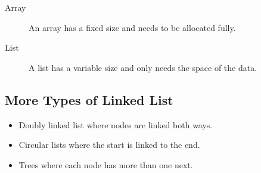 \begin{description}
    \item[Array] An array has a fixed size and needs to be allocated fully.
    \item[List] A list has a variable size and only needs the space of the data.
\end{description}

\subsection{More Types of Linked List}\label{sub:more_types_of_linked_list}

\begin{itemize}
    \item Doubly linked list where nodes are linked both ways.
    \item Circular lists where the start is linked to the end.
    \item Trees where each node has more than one next.
\end{itemize}

